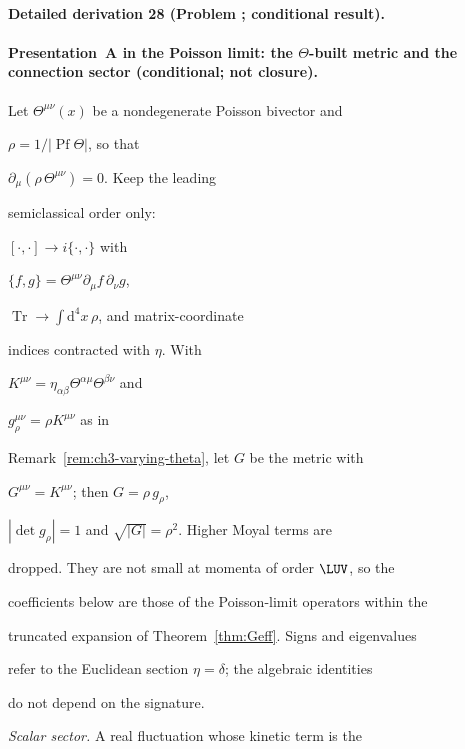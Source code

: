 \paragraph{Detailed derivation 28 (Problem ; conditional result).} \label{ref:detail-27} %



\paragraph{Presentation~A in the Poisson limit: the \(\Theta\)-built metric and the connection sector (conditional; not closure).}

Let \(\Theta^{\mu\nu}(x)\) be a nondegenerate Poisson bivector and

\(\rho=1/|\operatorname{Pf}\Theta|\), so that

\(\partial_\mu(\rho\,\Theta^{\mu\nu})=0\). Keep the leading

semiclassical order only:

\([\cdot,\cdot]\to i\{\cdot,\cdot\}\) with

\(\{f,g\}=\Theta^{\mu\nu}\partial_\mu f\,\partial_\nu g\),

\(\operatorname{Tr}\to\int\mathrm{d}^4x\,\rho\), and matrix-coordinate

indices contracted with \(\eta\). With

\(K^{\mu\nu}=\eta_{\alpha\beta}\Theta^{\alpha\mu}\Theta^{\beta\nu}\) and

\(g_\rho^{\mu\nu}=\rho K^{\mu\nu}\) as in

Remark~\ref{rem:ch3-varying-theta}, let \(G\) be the metric with

\(G^{\mu\nu}=K^{\mu\nu}\); then \(G=\rho\,g_\rho\),

\(|\det g_\rho|=1\) and \(\sqrt{|G|}=\rho^2\). Higher Moyal terms are

dropped. They are not small at momenta of order \(\LUV\), so the

coefficients below are those of the Poisson-limit operators within the

truncated expansion of Theorem~\ref{thm:Geff}. Signs and eigenvalues

refer to the Euclidean section \(\eta=\delta\); the algebraic identities

do not depend on the signature.



\emph{Scalar sector.} A real fluctuation whose kinetic term is the

